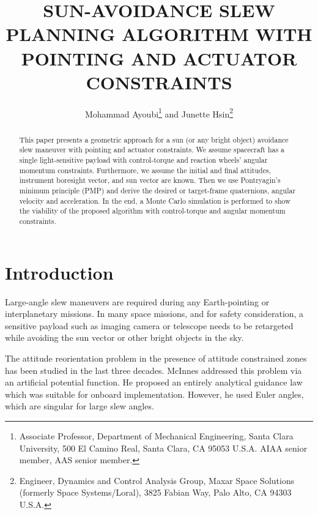\documentclass[letterpaper, preprint, paper,11pt]{AAS}	%
\begin{document}
	
	\title{SUN-AVOIDANCE SLEW PLANNING ALGORITHM WITH POINTING AND ACTUATOR CONSTRAINTS}
	
	\author{
		Mohammad Ayoubi\thanks{Associate Professor, Department of Mechanical Engineering, Santa Clara University, 500 El Camino Real, Santa Clara, CA 95053 U.S.A. AIAA senior member, AAS senior member.} and Junette Hsin\thanks{Engineer, Dynamics and Control Analysis Group, Maxar Space Solutions (formerly Space Systems/Loral), 3825 Fabian Way, Palo Alto, CA 94303 U.S.A.}
	}
	
	
	\maketitle{} 		
	
	
	\begin{abstract}
		
This paper presents a geometric approach for a sun (or any bright object) avoidance slew maneuver with pointing and actuator constraints. We assume spacecraft has a single light-sensitive payload with control-torque and reaction wheels' angular momentum constraints. Furthermore, we assume the initial and final attitudes, instrument boresight vector, and sun vector are known. Then we use Pontryagin's minimum principle (PMP) and derive the desired or target-frame quaternions, angular velocity and acceleration. In the end, a Monte Carlo simulation is performed to show the viability of the proposed algorithm with control-torque and angular momentum constraints. 
	\end{abstract}
	
	\section{Introduction}
	Large-angle slew maneuvers are required during any Earth-pointing or interplanetary missions. In many space missions, and for safety consideration, a sensitive payload such as imaging camera or telescope needs to be retargeted while avoiding the sun vector or other bright objects in the sky.
	
	The attitude reorientation problem in the presence of attitude constrained zones has been studied in the last three decades. McInnes\cite{McInnes1994} addressed this problem via an artificial potential function. He proposed an entirely analytical guidance law which was suitable for onboard implementation. However, he used Euler angles, which are singular for large slew angles. 
	
\end{document}
